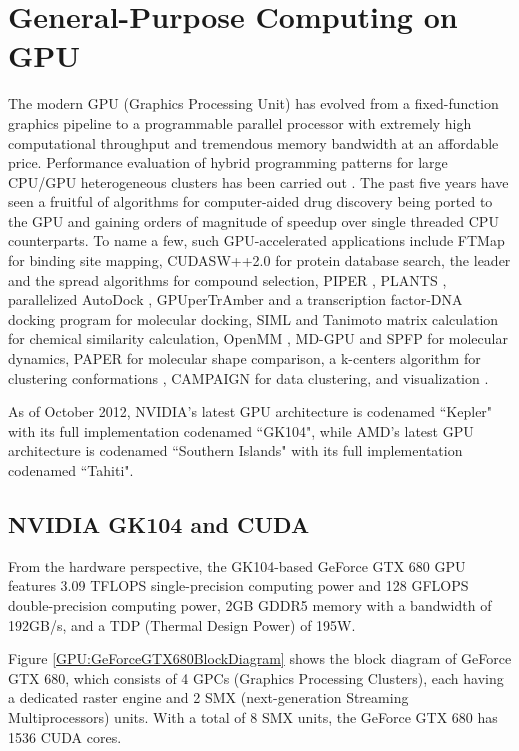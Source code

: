 \section{General-Purpose Computing on GPU}

The modern GPU (Graphics Processing Unit) has evolved from a fixed-function graphics pipeline to a programmable parallel processor with extremely high computational throughput and tremendous memory bandwidth at an affordable price. Performance evaluation of hybrid programming patterns for large CPU/GPU heterogeneous clusters has been carried out \citep{1035}. The past five years have seen a fruitful of algorithms for computer-aided drug discovery being ported to the GPU and gaining orders of magnitude of speedup over single threaded CPU counterparts. To name a few, such GPU-accelerated applications include FTMap \citep{722} for binding site mapping, CUDASW++2.0 \citep{189} for protein database search, the leader and the spread algorithms \citep{750} for compound selection, PIPER \citep{723}, PLANTS \citep{779}, parallelized AutoDock \citep{696}, GPUperTrAmber \citep{1270} and a transcription factor-DNA docking program \citep{1267,1266} for molecular docking, SIML \citep{726} and Tanimoto matrix calculation \citep{881} for chemical similarity calculation, OpenMM \citep{373}, MD-GPU \citep{374} and SPFP \citep{1261} for molecular dynamics, PAPER \citep{491} for molecular shape comparison, a k-centers algorithm for clustering conformations \citep{1275}, CAMPAIGN \citep{932} for data clustering, and visualization \citep{986}.

As of October 2012, NVIDIA’s latest GPU architecture is codenamed ``Kepler" with its full implementation codenamed ``GK104", while AMD's latest GPU architecture is codenamed ``Southern Islands" with its full implementation codenamed ``Tahiti".

\subsection{NVIDIA GK104 and CUDA}

From the hardware perspective, the GK104-based GeForce GTX 680 GPU features 3.09 TFLOPS single-precision computing power and 128 GFLOPS double-precision computing power, 2GB GDDR5 memory with a bandwidth of 192GB/s, and a TDP (Thermal Design Power) of 195W.

Figure \ref{GPU:GeForceGTX680BlockDiagram} shows the block diagram of GeForce GTX 680, which consists of 4 GPCs (Graphics Processing Clusters), each having a dedicated raster engine and 2 SMX (next-generation Streaming Multiprocessors) units. With a total of 8 SMX units, the GeForce GTX 680 has 1536 CUDA cores.

